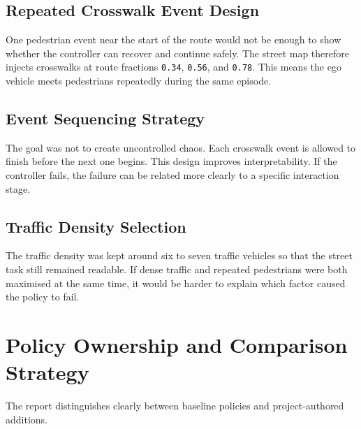 \documentclass[12pt,a4paper]{report}
\begin{document}
\subsection{Repeated Crosswalk Event Design}
One pedestrian event near the start of the route would not be enough to show whether the controller can recover and continue safely. The street map therefore injects crosswalks at route fractions \texttt{0.34}, \texttt{0.56}, and \texttt{0.78}. This means the ego vehicle meets pedestrians repeatedly during the same episode.

\subsection{Event Sequencing Strategy}
The goal was not to create uncontrolled chaos. Each crosswalk event is allowed to finish before the next one begins. This design improves interpretability. If the controller fails, the failure can be related more clearly to a specific interaction stage.

\subsection{Traffic Density Selection}
The traffic density was kept around six to seven traffic vehicles so that the street task still remained readable. If dense traffic and repeated pedestrians were both maximised at the same time, it would be harder to explain which factor caused the policy to fail.

\section{Policy Ownership and Comparison Strategy}
The report distinguishes clearly between baseline policies and project-authored additions.
\end{document}
